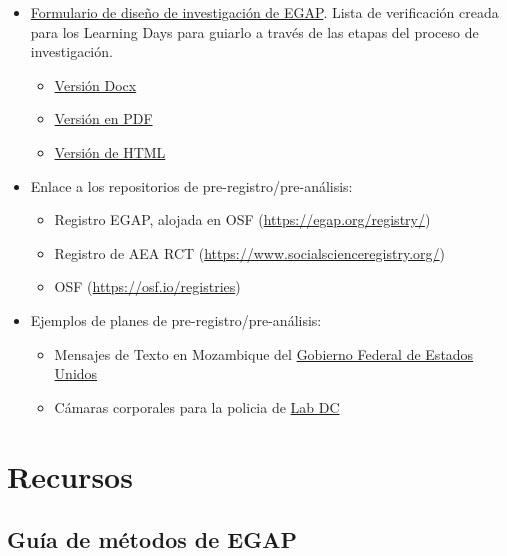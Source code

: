 \documentclass[
  12pt,
  spanish,
]{book}
\begin{document}
\begin{itemize}
\item
  \href{https://egap.github.io/learningdays-resources/Exercises/design-form.html}{Formulario de diseño de investigación de EGAP}. Lista de verificación creada para los Learning Days para guiarlo a través de las etapas del proceso de investigación.

  \begin{itemize}
  \item
    \href{https://egap.github.io/learningdays-resources/Exercises/design-form.docx}{Versión Docx}
  \item
    \href{https://egap.github.io/learningdays-resources/Exercises/design-form.pdf}{Versión en PDF}
  \item
    \href{https://egap.github.io/learningdays-resources/Exercises/design-form.html}{Versión de HTML}
  \end{itemize}
\item
  Enlace a los repositorios de pre-registro/pre-análisis:

  \begin{itemize}
  \item
    Registro EGAP, alojada en OSF (\url{https://egap.org/registry/})
  \item
    Registro de AEA RCT (\url{https://www.socialscienceregistry.org/})
  \item
    OSF (\url{https://osf.io/registries})
  \end{itemize}
\item
  Ejemplos de planes de pre-registro/pre-análisis:

  \begin{itemize}
  \item
    Mensajes de Texto en Mozambique del \href{https://oes.gsa.gov/projects/sms-mozambique/}{Gobierno Federal de Estados Unidos}
  \item
    Cámaras corporales para la policia de \href{https://osf.io/472zh}{Lab DC}
  \end{itemize}
\end{itemize}

\hypertarget{recursos}{%
\section{Recursos}\label{recursos}}

\hypertarget{guuxeda-de-muxe9todos-de-egap}{%
\subsection{Guía de métodos de EGAP}\label{guuxeda-de-muxe9todos-de-egap}}
\end{document}
